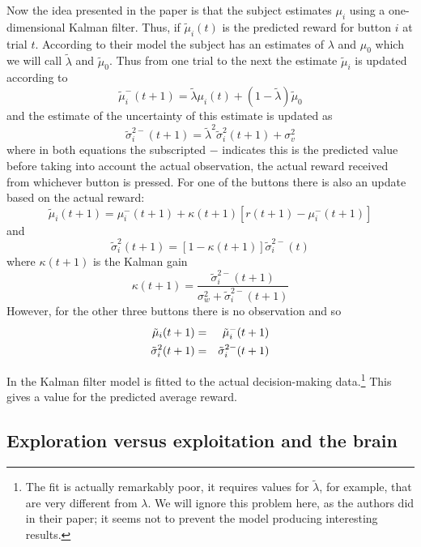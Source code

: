 \documentclass[12pt]{article}
\begin{document}
Now the idea presented in the paper is that the subject estimates
$\mu_i$ using a one-dimensional Kalman filter. Thus, if
$\tilde{\mu}_i(t)$ is the predicted reward for button $i$ at trial
$t$. According to their model the subject has an estimates of
$\lambda$ and $\mu_0$ which we will call $\tilde{\lambda}$ and
$\tilde{\mu}_0$. Thus from one trial to the next the estimate
$\tilde{\mu}_i$ is updated according to
\begin{equation}
\tilde{\mu}_i^-(t+1)=\tilde{\lambda}\mu_i(t)+(1-\tilde{\lambda})\tilde{\mu}_0
\end{equation}
and the estimate of the uncertainty of this estimate is updated as
\begin{equation}
\tilde{\sigma}^{2-}_i(t+1)=\tilde{\lambda}^2\tilde{\sigma}^2_i(t+1)+\sigma^2_v
\end{equation}
where in both equations the subscripted $-$ indicates this is the
predicted value before taking into account the actual observation, the
actual reward received from whichever button is pressed. For one of
the buttons there is also an update based on the actual reward:
\begin{equation}
\tilde{\mu}_i(t+1)=\mu_i^-(t+1)+\kappa(t+1)[r(t+1)-\mu_i^-(t+1)]
\end{equation}
and
\begin{equation}
\tilde{\sigma}^{2}_i(t+1)=[1-\kappa(t+1)]\tilde{\sigma}^{2-}_i(t)
\end{equation}
where $\kappa(t+1)$ is the Kalman gain
\begin{equation}
\kappa(t+1)=\frac{\tilde{\sigma}^{2-}_i(t+1)}{\sigma^2_w+\tilde{\sigma}^{2-}_i(t+1)}
\end{equation}
However, for the other three buttons there is no observation and so
\begin{eqnarray}
\tilde{\mu}_i(t+1)&=&\tilde{\mu}^-_i(t+1)\cr
\tilde{\sigma}^{2}_i(t+1)&=&\tilde{\sigma}^{2-}_i(t+1)
\end{eqnarray}

In \citet{DawEtAl2006} the Kalman filter model is fitted to the actual
decision-making data.\footnote{The fit is actually remarkably poor, it
  requires values for $\tilde{\lambda}$, for example, that are very
  different from $\lambda$. We will ignore this problem here, as the
  authors did in their paper; it seems not to prevent the model
  producing interesting results.} This gives a value for the predicted
average reward.

\subsection*{Exploration versus exploitation and the brain}
\end{document}
